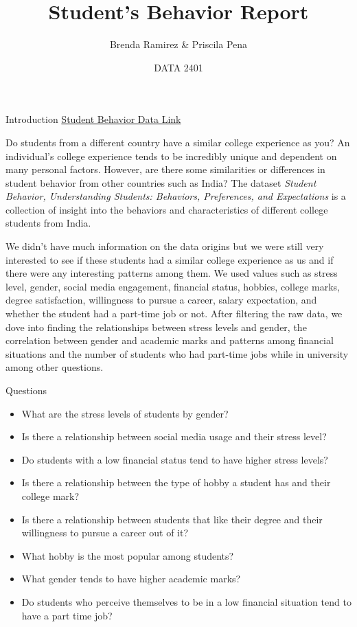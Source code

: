 \documentclass[
  ignorenonframetext,
]{beamer}
\title{Student's Behavior Report}
\author{Brenda Ramirez \& Priscila Pena}
\date{DATA 2401}
\begin{document}
\frame{\titlepage}

\begin{frame}{Introduction}
\protect\hypertarget{introduction}{}
\href{https://www.kaggle.com/datasets/gunapro/student-behavior/data}{Student
Behavior Data Link}

Do students from a different country have a similar college experience
as you? An individual's college experience tends to be incredibly unique
and dependent on many personal factors. However, are there some
similarities or differences in student behavior from other countries
such as India? The dataset \emph{Student Behavior, Understanding
Students: Behaviors, Preferences, and Expectations} is a collection of
insight into the behaviors and characteristics of different college
students from India.~

We didn't have much information on the data origins but we were still
very interested to see if these students had a similar college
experience as us and if there were any interesting patterns among them.
We used values such as stress level, gender, social media engagement,
financial status, hobbies, college marks, degree satisfaction,
willingness to pursue a career, salary expectation, and whether the
student had a part-time job or not. After filtering the raw data, we
dove into finding the relationships between stress levels and gender,
the correlation between gender and academic marks and patterns among
financial situations and the number of students who had part-time jobs
while in university among other questions.~
\end{frame}

\begin{frame}{Questions}
\protect\hypertarget{questions}{}
\begin{itemize}
\item
  What are the stress levels of students by gender?
\item
  Is there a relationship between social media usage and their stress
  level?
\item
  Do students with a low financial status tend to have higher stress
  levels?
\item
  Is there a relationship between the type of hobby a student has and
  their college mark?
\item
  Is there a relationship between students that like their degree and
  their willingness to pursue a career out of it?
\item
  What hobby is the most popular among students?
\item
  What gender tends to have higher academic marks?
\item
  Do students who perceive themselves to be in a low financial situation
  tend to have a part time job?
\end{itemize}
\end{frame}
\end{document}
